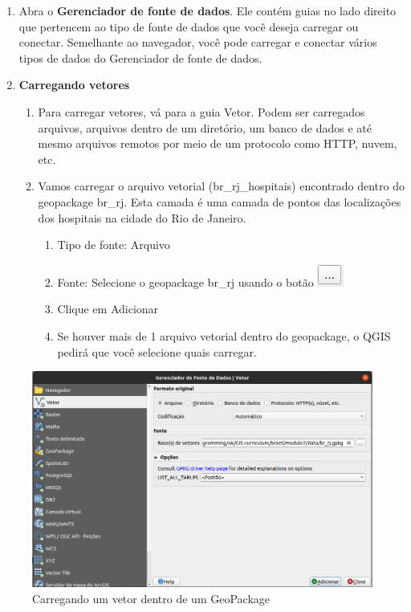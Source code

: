 \documentclass[
]{krantz}
\providecommand{\tightlist}{%
  \setlength{\itemsep}{0pt}\setlength{\parskip}{0pt}}
\begin{document}
\begin{enumerate}
\def\labelenumi{\arabic{enumi}.}
\item
  Abra o \textbf{Gerenciador de fonte de dados}. Ele contém guias no lado direito que pertencem ao tipo de fonte de dados que você deseja carregar ou conectar. Semelhante ao navegador, você pode carregar e conectar vários tipos de dados do Gerenciador de fonte de dados.
\item
  \textbf{Carregando vetores}

  \begin{enumerate}
  \def\labelenumii{\arabic{enumii}.}
  \item
    Para carregar vetores, vá para a guia Vetor. Podem ser carregados arquivos, arquivos dentro de um diretório, um banco de dados e até mesmo arquivos remotos por meio de um protocolo como HTTP, nuvem, etc.
  \item
    Vamos carregar o arquivo vetorial (br\_rj\_hospitais) encontrado dentro do geopackage br\_rj. Esta camada é uma camada de pontos das localizações dos hospitais na cidade do Rio de Janeiro.

    \begin{enumerate}
    \def\labelenumiii{\arabic{enumiii}.}
    \tightlist
    \item
      Tipo de fonte: Arquivo
    \item
      Fonte: Selecione o geopackage br\_rj usando o botão \includegraphics{media/modulo2/data-source-manager-search.png}
    \item
      Clique em Adicionar
    \item
      Se houver mais de 1 arquivo vetorial dentro do geopackage, o QGIS pedirá que você selecione quais carregar.
    \end{enumerate}
  \end{enumerate}
\end{enumerate}

\begin{figure}
\centering
\includegraphics{media/modulo2/data-source-manager-vector.png}
\caption{Carregando um vetor dentro de um GeoPackage}
\end{figure}
\end{document}
